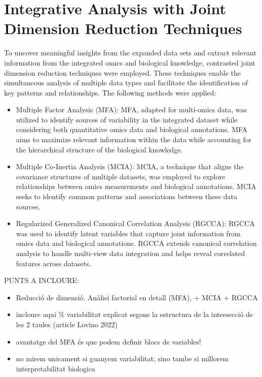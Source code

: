 \documentclass[a4paper, nobind]{templates/ociamthesis}
\begin{document}
\hypertarget{integrative-analysis-with-joint-dimension-reduction-techniques}{%
\section{Integrative Analysis with Joint Dimension Reduction Techniques}\label{integrative-analysis-with-joint-dimension-reduction-techniques}}

To uncover meaningful insights from the expanded data sets and extract relevant information from the integrated omics and biological knowledge, contrasted joint dimension reduction techniques were employed. These techniques enable the simultaneous analysis of multiple data types and facilitate the identification of key patterns and relationships. The following methods were applied:

\begin{itemize}
\item
  Multiple Factor Analysis (MFA): MFA, adapted for multi-omics data, was utilized to identify sources of variability in the integrated dataset while considering both quantitative omics data and biological annotations. MFA aims to maximize relevant information within the data while accounting for the hierarchical structure of the biological knowledge.
\item
  Multiple Co-Inertia Analysis (MCIA): MCIA, a technique that aligns the covariance structures of multiple datasets, was employed to explore relationships between omics measurements and biological annotations. MCIA seeks to identify common patterns and associations between these data sources.
\item
  Regularized Generalized Canonical Correlation Analysis (RGCCA): RGCCA was used to identify latent variables that capture joint information from omics data and biological annotations. RGCCA extends canonical correlation analysis to handle multi-view data integration and helps reveal correlated features across datasets.
\end{itemize}

PUNTS A INCLOURE:

\begin{itemize}
\item
  Reducció de dimensió. Anàlisi factorial en detall (MFA), + MCIA + RGCCA
\item
  incloure aquí \% variabilitat explicat segons la estructura de la intersecció de les 2 taules (article Lovino 2022)
\item
  avantatge del MFA és que podem definir blocs de variables!
\item
  no mirem unicament si guanyem variabilitat, sino tambe si millorem interpretabilitat biologica
\end{itemize}
\end{document}
